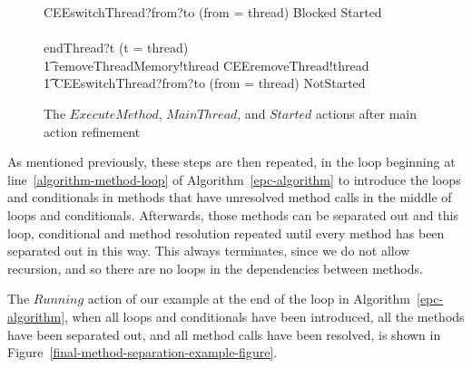 \begin{figure}[t!]
\begin{circusaction}
    CEEswitchThread?from?to \prefixcolon (from = thread) \then Blocked \circseq Started \\
    {} \extchoice {} \\
    endThread?t \prefixcolon (t = thread) \then \Skip
    \circblockend \circseq \\
    \t1 removeThreadMemory!thread \then CEEremoveThread!thread \\
    \t1 {} \then CEEswitchThread?from?to \prefixcolon (from = thread) \then NotStarted
  \end{circusaction}
  \caption{The $ExecuteMethod$, $MainThread$, and $Started$ actions
    after main action refinement}
  \label{refine-main-actions-example-figure}
\end{figure}

As mentioned previously, these steps are then repeated, in the loop
beginning at line~\ref{algorithm-method-loop} of
Algorithm~\ref{epc-algorithm} to introduce the loops and conditionals
in methods that have unresolved method calls in the middle of loops
and conditionals.
Afterwards, those methods can be separated out and this loop,
conditional and method resolution repeated until every method has been
separated out in this way.
This always terminates, since we do not allow recursion, and so there
are no loops in the dependencies between methods.


The $Running$ action of our example at the end of the loop in
Algorithm~\ref{epc-algorithm}, when all loops and conditionals have
been introduced, all the methods have been separated out, and all
method calls have been resolved, is shown in
Figure~\ref{final-method-separation-example-figure}.


